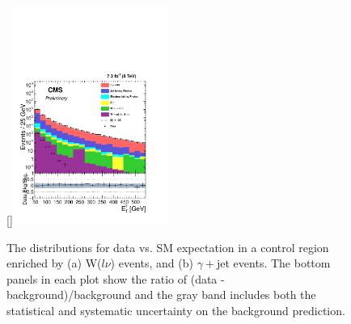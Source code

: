 \begin{figure}[H]                  
[]{\label{fig:QCDMET}\includegraphics[width=0.45\textwidth]{PAS_Plots2/StackedHisto_Pho_Pt_Preliminary.pdf}}
\caption{The \etg distributions for data vs. SM expectation in a control region enriched by (a)  W($l\nu$) events, and (b) $\gamma+$jet events. The bottom panels in each plot show the ratio of (data - background)/background and the gray band includes both the statistical and systematic uncertainty on the background prediction.}
\label{fig:CR12}                     
\end{figure} 

  

